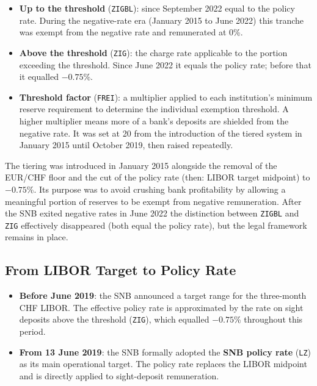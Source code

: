 \documentclass[12pt,a4paper]{article}
\begin{document}
\begin{itemize}[leftmargin=1.5em, itemsep=2pt]
  \item \textbf{Up to the threshold} (\texttt{ZIGBL}): since September 2022 equal
    to the policy rate.  During the negative-rate era (January 2015 to
    June 2022) this tranche was exempt from the negative rate and remunerated
    at 0\%.
  \item \textbf{Above the threshold} (\texttt{ZIG}): the charge rate applicable
    to the portion exceeding the threshold.  Since June 2022 it equals the
    policy rate; before that it equalled $-0.75$\%.
  \item \textbf{Threshold factor} (\texttt{FREI}): a multiplier applied to each
    institution's minimum reserve requirement to determine the individual
    exemption threshold.  A higher multiplier means more of a bank's deposits
    are shielded from the negative rate.  It was set at 20 from the introduction
    of the tiered system in January 2015 until October 2019, then raised
    repeatedly.
\end{itemize}

The tiering was introduced in January 2015 alongside the removal of the
EUR/CHF floor and the cut of the policy rate (then: LIBOR target midpoint) to
$-0.75$\%.  Its purpose was to avoid crushing bank profitability by allowing a
meaningful portion of reserves to be exempt from negative remuneration.  After
the SNB exited negative rates in June 2022 the distinction between \texttt{ZIGBL}
and \texttt{ZIG} effectively disappeared (both equal the policy rate), but the
legal framework remains in place.

\subsection{From LIBOR Target to Policy Rate}

\begin{itemize}[leftmargin=1.5em, itemsep=2pt]
  \item \textbf{Before June 2019}: the SNB announced a target range for the
    three-month CHF LIBOR.  The effective policy rate is approximated by the
    rate on sight deposits above the threshold (\texttt{ZIG}), which equalled
    $-0.75$\% throughout this period.
  \item \textbf{From 13 June 2019}: the SNB formally adopted the
    \textbf{SNB policy rate} (\texttt{LZ}) as its main operational target.
    The policy rate replaces the LIBOR midpoint and is directly applied to
    sight-deposit remuneration.
\end{itemize}
\end{document}

